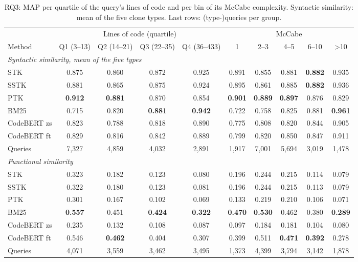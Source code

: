\begin{table}[!htbp]
\centering
\caption{RQ3: MAP per quartile of the query's lines of code and per bin of its McCabe complexity. Syntactic similarity: mean of the five clone types. Last rows: (type-)queries per group.}
\label{tab:rq3}
\footnotesize
\setlength{\tabcolsep}{3.5pt}
\begin{tabular}{lcccc|ccccc}
\toprule
 & \multicolumn{4}{c|}{Lines of code (quartile)} & \multicolumn{5}{c}{McCabe} \\
Method & Q1 (3--13) & Q2 (14--21) & Q3 (22--35) & Q4 (36--433) & 1 & 2--3 & 4--5 & 6--10 & >10 \\
\midrule
\multicolumn{10}{l}{\emph{Syntactic similarity, mean of the five types}} \\
\quad STK & 0.875 & 0.860 & 0.872 & 0.925 & 0.891 & 0.855 & 0.881 & \textbf{0.882} & 0.935 \\
\quad SSTK & 0.881 & 0.865 & 0.875 & 0.924 & 0.895 & 0.861 & 0.885 & \textbf{0.882} & 0.936 \\
\quad PTK & \textbf{0.912} & \textbf{0.881} & 0.870 & 0.854 & \textbf{0.901} & \textbf{0.889} & \textbf{0.897} & 0.876 & 0.829 \\
\cmidrule(lr){1-10}
\quad BM25 & 0.715 & 0.820 & \textbf{0.881} & \textbf{0.942} & 0.722 & 0.758 & 0.825 & 0.881 & \textbf{0.961} \\
\quad CodeBERT zs & 0.823 & 0.788 & 0.818 & 0.890 & 0.775 & 0.808 & 0.820 & 0.844 & 0.905 \\
\quad CodeBERT ft & 0.829 & 0.816 & 0.842 & 0.889 & 0.799 & 0.820 & 0.850 & 0.847 & 0.911 \\
\quad Queries & 7,327 & 4,859 & 4,032 & 2,891 & 1,917 & 7,001 & 5,694 & 3,019 & 1,478 \\
\midrule
\multicolumn{10}{l}{\emph{Functional similarity}} \\
\quad STK & 0.323 & 0.182 & 0.123 & 0.080 & 0.196 & 0.244 & 0.215 & 0.114 & 0.079 \\
\quad SSTK & 0.322 & 0.180 & 0.123 & 0.081 & 0.196 & 0.244 & 0.215 & 0.113 & 0.079 \\
\quad PTK & 0.301 & 0.167 & 0.102 & 0.069 & 0.133 & 0.219 & 0.210 & 0.106 & 0.071 \\
\cmidrule(lr){1-10}
\quad BM25 & \textbf{0.557} & 0.451 & \textbf{0.424} & \textbf{0.322} & \textbf{0.470} & \textbf{0.530} & 0.462 & 0.380 & \textbf{0.289} \\
\quad CodeBERT zs & 0.235 & 0.132 & 0.108 & 0.087 & 0.097 & 0.184 & 0.181 & 0.104 & 0.080 \\
\quad CodeBERT ft & 0.546 & \textbf{0.462} & 0.404 & 0.307 & 0.399 & 0.511 & \textbf{0.471} & \textbf{0.392} & 0.278 \\
\quad Queries & 4,071 & 3,559 & 3,462 & 3,495 & 1,373 & 4,399 & 3,794 & 3,142 & 1,878 \\
\bottomrule
\end{tabular}
\end{table}
